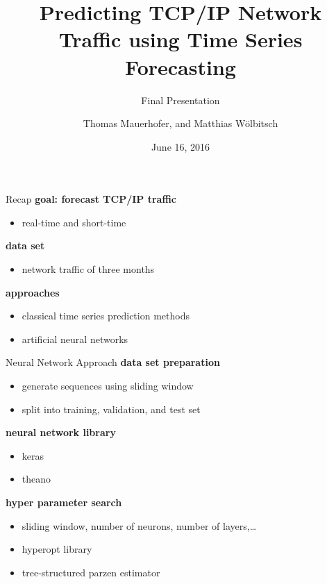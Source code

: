 \documentclass{beamer}
\title{Predicting TCP/IP Network Traffic using Time Series Forecasting}
\subtitle{Final Presentation}
\date{June 16, 2016}
\author{Thomas Mauerhofer, and Matthias Wölbitsch}
\begin{document}
  \maketitle
  
  \begin{frame}{Recap}   
    \textbf{goal: forecast TCP/IP traffic}
    \begin{itemize}
     \item real-time and short-time
    \end{itemize}
    
    \textbf{data set}
    \begin{itemize}
     \item network traffic of three months
    \end{itemize}
    
    \textbf{approaches}
    \begin{itemize}
     \item classical time series prediction methods
     \item artificial neural networks
    \end{itemize}
  \end{frame}
 
 
  \begin{frame}{Neural Network Approach}
    \textbf{data set preparation}
    \begin{itemize}
     \item generate sequences using sliding window 
     \item split into training, validation, and test set
    \end{itemize}
  
    \textbf{neural network library}
    \begin{itemize}
      \item keras 
      \item theano
    \end{itemize}
    
    \textbf{hyper parameter search}
    \begin{itemize}
     \item sliding window, number of neurons, number of layers,\ldots
     \item hyperopt library
     \item tree-structured parzen estimator
    \end{itemize}
  \end{frame}
  
\end{document}
